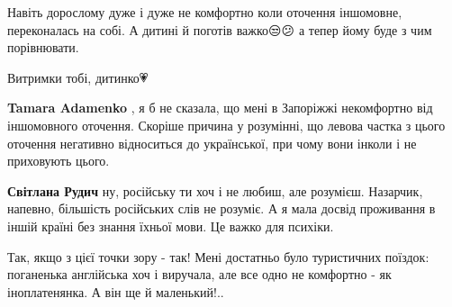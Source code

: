 \begin{itemize}
 

Навіть дорослому дуже і дуже не комфортно коли оточення іншомовне, переконалась
на собі. А дитині й поготів важко😒😕 а тепер йому буде з чим порівнювати.

Витримки тобі, дитинко💗

\begin{itemize}
 
\textbf{Tamara Adamenko} , я б не сказала, що мені в Запоріжжі некомфортно від
іншомовного оточення. Скоріше причина у розумінні, що левова частка з цього
оточення негативно відноситься до української, при чому вони інколи і не
приховують цього.

 
\textbf{Світлана Рудич} ну, російську ти хоч і не любиш, але розумієш.
Назарчик, напевно, більшість російських слів не розуміє. А я мала досвід
проживання в іншій країні без знання їхньої мови. Це важко для психіки.


 

Так, якщо з цієї точки зору - так! Мені достатньо було туристичних поїздок:
поганенька англійська хоч і виручала, але все одно не комфортно - як
іноплатенянка. А він ще й маленький!..

\end{itemize}

 

\end{itemize}
